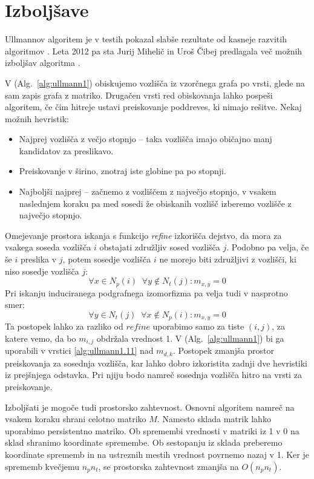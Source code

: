 \documentclass[a4paper, 12pt, ]{book}
\newcommand{\refalg}[1]{(Alg.~\ref{#1})}
\begin{document}
	\section{Izboljšave}
	\label{ull_imp}
	Ullmannov algoritem je v testih pokazal slabše rezultate od kasneje razvitih algoritmov \cite{vf2_2}. Leta 2012 pa sta Jurij Mihelič in Uroš Čibej predlagala
	več možnih izboljšav algoritma \cite{ull+}.
	
	V \refalg{alg:ullmann1} obiskujemo vozlišča iz vzorčnega grafa po vrsti, glede na sam zapis grafa z matriko. Drugačen vrsti red obiskovanja lahko
	pospeši algoritem, če čim hitreje ustavi preiskovanje poddreves, ki nimajo rešitve. Nekaj možnih hevristik:
	\begin{itemize}
	\item Najprej vozlišča z večjo stopnjo -- taka vozlišča imajo običajno manj kandidatov za preslikavo.
	\item Preiskovanje v širino, znotraj iste globine pa po stopnji.
	\item Najboljši najprej -- začnemo z vozliščem z največjo stopnjo, v vsakem naslednjem koraku pa med sosedi že obiskanih vozlišč izberemo vozlišče z
	največjo stopnjo.
	\end{itemize}
	
	Omejevanje prostora iskanja s funkcijo \textit{refine} izkorišča dejstvo, da mora za vsakega soseda vozlišča $i$ obstajati združljiv sosed vozlišča $j$.
	Podobno pa velja, če še $i$ preslika v $j$, potem sosedje vozlišča $i$ ne morejo biti združljivi z vozlišči, ki niso sosedje vozlišča $j$:
	\begin{equation}
	\label{eq:ullmann_imp1}
	\forall x \in N_p(i) \;\; \forall y \not \in N_t(j) : m_{x,y} = 0
	\end{equation}
	Pri iskanju induciranega podgrafnega izomorfizma pa velja tudi v nasprotno smer:
	\begin{equation}
	\label{eq:ullmann_imp2}
	\forall y \in N_t(j) \;\; \forall x \not \in N_p(i) : m_{x,y} = 0
	\end{equation}
	Ta postopek lahko za razliko od $refine$ uporabimo samo za tiste $(i, j)$, za katere vemo, da bo $m_{i,j}$ obdržala vrednost 1. V \refalg{alg:ullmann1}
	bi ga uporabili v vrstici \ref{alg:ullmann1.11} nad $m_{d,k}$. Postopek zmanjša prostor preiskovanja za sosednja vozlišča, kar lahko dobro izkoristita 
	zadnji dve hevristiki iz prejšnjega odstavka. Pri njiju bodo namreč sosednja vozlišča hitro na vrsti za preiskovanje.
	
	Izboljšati je mogoče tudi prostorsko zahtevnost. Osnovni algoritem namreč na vsakem koraku shrani celotno matriko $M$. Namesto sklada matrik lahko
	uporabimo persistentno matriko. Ob spremembi vrednosti v matriki iz 1 v 0 na sklad shranimo koordinate spremembe. Ob sestopanju iz sklada
	preberemo koordinate sprememb in na ustreznih mestih vrednost povrnemo nazaj v 1. Ker je sprememb kvečjemu $n_p n_t$, se prostorska
	zahtevnost zmanjša na $O(n_p n_t)$.
\end{document}
